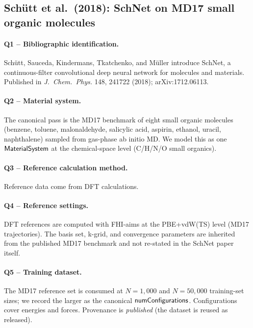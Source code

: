 \subsection{Sch\"utt et al.\ (2018): SchNet on MD17 small organic molecules}
\label{sec:appendix-example-schutt2018}

\paragraph{Q1 -- Bibliographic identification.}
Sch\"utt, Sauceda, Kindermans, Tkatchenko, and M\"uller introduce
SchNet, a continuous-filter convolutional deep neural network for
molecules and materials. Published in \emph{J.\ Chem.\ Phys.} 148,
241722 (2018); arXiv:1712.06113.


\paragraph{Q2 -- Material system.}
The canonical pass is the MD17 benchmark of eight small organic
molecules (benzene, toluene, malonaldehyde, salicylic acid, aspirin,
ethanol, uracil, naphthalene) sampled from gas-phase ab initio MD.
We model this as one $\mathsf{MaterialSystem}$ at the chemical-space level
(C/H/N/O small organics).


\paragraph{Q3 -- Reference calculation method.}
Reference data come from DFT calculations.


\paragraph{Q4 -- Reference settings.}
DFT references are computed with FHI-aims at the PBE+vdW(TS) level
(MD17 trajectories). The basis set, k-grid, and convergence
parameters are inherited from the published MD17 benchmark and not
re-stated in the SchNet paper itself.


\paragraph{Q5 -- Training dataset.}
The MD17 reference set is consumed at $N=1{,}000$ and $N=50{,}000$
training-set sizes; we record the larger as the canonical
$\mathsf{numConfigurations}$. Configurations cover energies and
forces. Provenance is \emph{published} (the dataset is reused as
released).


